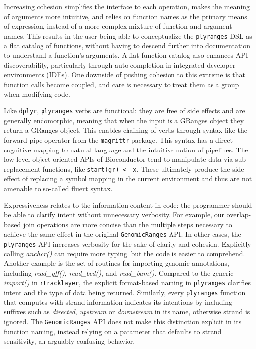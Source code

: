 \documentclass[]{article}
\begin{document}
Increasing cohesion simplifies the interface to each operation, makes
the meaning of arguments more intuitive, and relies on function names as
the primary means of expression, instead of a more complex mixture of
function and argument names. This results in the user being able to
conceptualize the \texttt{plyranges} DSL as a flat catalog of functions,
without having to descend further into documentation to understand a
function's arguments. A flat function catalog also enhances API
discoverability, particularly through auto-completion in integrated
developer environments (IDEs). One downside of pushing cohesion to this
extreme is that function calls become coupled, and care is necessary to
treat them as a group when modifying code.

Like \texttt{dplyr}, \texttt{plyranges} verbs are functional: they are
free of side effects and are generally endomorphic, meaning that when
the input is a GRanges object they return a GRanges object. This enables
chaining of verbs through syntax like the forward pipe operator from the
\texttt{magrittr} package. This syntax has a direct cognitive mapping to
natural language and the intuitive notion of pipelines. The low-level
object-oriented APIs of Bioconductor tend to manipulate data via
sub-replacement functions, like \texttt{start(gr)\ \textless{}-\ x}.
These ultimately produce the side effect of replacing a symbol mapping
in the current environment and thus are not amenable to so-called fluent
syntax.

Expressiveness relates to the information content in code: the
programmer should be able to clarify intent without unnecessary
verbosity. For example, our overlap-based join operations are more
concise than the multiple steps necessary to achieve the same effect in
the original \texttt{GenomicRanges} API. In other cases, the
\texttt{plyranges} API increases verbosity for the sake of clarity and
cohesion. Explicitly calling \emph{anchor()} can require more typing,
but the code is easier to comprehend. Another example is the set of
routines for importing genomic annotations, including
\emph{read\_gff()}, \emph{read\_bed()}, and \emph{read\_bam()}. Compared
to the generic \emph{import()} in \texttt{rtracklayer}, the explicit
format-based naming in \texttt{plyranges} clarifies intent and the type
of data being returned. Similarly, every \texttt{plyranges} function
that computes with strand information indicates its intentions by
including suffixes such as \emph{directed}, \emph{upstream} or
\emph{downstream} in its name, otherwise strand is ignored. The
\texttt{GenomicRanges} API does not make this distinction explicit in
its function naming, instead relying on a parameter that defaults to
strand sensitivity, an arguably confusing behavior.
\end{document}

